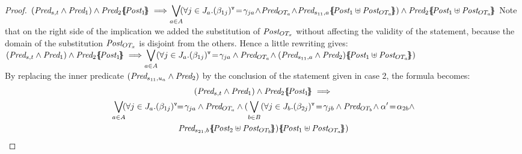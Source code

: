\documentclass{lmcs}
\begin{document}
\begin{proof}
$(\Pred_{s,t} \land \Pred_1)\wedge\Pred_2\subst{\Post_1}\implies \\
 \displaystyle{\bigvee_{a\in A}}
  \!\! ( \forall j\in J_a. \vis{\beta_{1j}}\!=\!\gamma_{ja}\!  \land\! \Pred_{OT_a}\! \land\!
     \Pred_{s_{11},a}\subst{\Post_1\uplus\Post_{OT_a}}) \wedge \Pred_2\subst{\Post_1\uplus\Post_{OT_a}}  
$
Note that  on the right side of the implication we added  the substitution  of $\Post_{OT_x}$ without affecting the validity of the statement, because  the domain  of the substitution $\Post_{OT_x}$ is disjoint from the others. Hence a little rewriting gives:\\
$(\Pred_{s,t} \land \Pred_1)\wedge\Pred_2\subst{\Post_1}\implies\\
\displaystyle{\bigvee_{a\in A}}
\!\!   \left(\forall j\in J_a. \vis{\beta_{1j}}\!=\!\gamma_{ja}\land \Pred_{OT_a}
     \!\land(\Pred_{s_{11},a}\wedge\Pred_2)\subst{\Post_1\uplus\Post_{OT_a}} \right)$\\
By replacing the inner predicate $(\Pred_{s_{11},u_a}\wedge\Pred_2)$ by the conclusion of the  statement given in case 2,  the formula becomes: 
\begin{multline*}(\Pred_{s,t} \land \Pred_1)\wedge\Pred_2\subst{\Post_1}\implies\\
{\bigvee_{a\in A}}
   \!\!(\forall j\in J_a. \vis{\beta_{1j}}\!\!=\!\gamma_{ja}  \land \Pred_{OT_a}
      \land ({\bigvee_{b\in B}}(
    \forall j\in J_{b}. \vis{\beta_{2j}}\!=\!\gamma_{jb}  \land \Pred_{OT_{b}}\!\land 
    \alpha'\!=\!\alpha_{2 b} \land\\ \Pred_{s_{21},b}\subst{\Post_2\uplus\Post_{OT_{b}}})\subst{\Post_1\uplus\Post_{OT_a}})
\end{multline*}


\end{proof}
\end{document}
